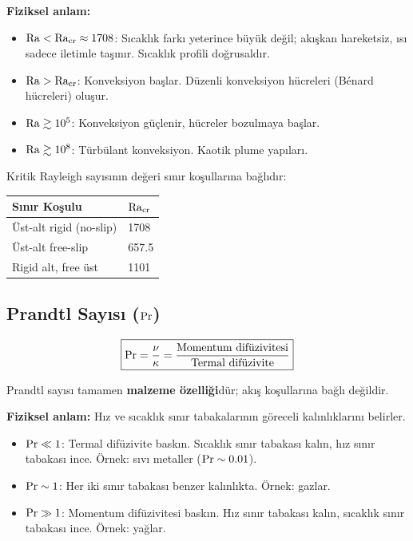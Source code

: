 \textbf{Fiziksel anlam:}
\begin{itemize}
    \item $\mathrm{Ra} < \mathrm{Ra}_{\text{cr}} \approx 1708$: Sıcaklık farkı yeterince büyük değil; akışkan hareketsiz, ısı sadece iletimle taşınır. Sıcaklık profili doğrusaldır.
    \item $\mathrm{Ra} > \mathrm{Ra}_{\text{cr}}$: Konveksiyon başlar. Düzenli konveksiyon hücreleri (B\'{e}nard hücreleri) oluşur.
    \item $\mathrm{Ra} \gtrsim 10^5$: Konveksiyon güçlenir, hücreler bozulmaya başlar.
    \item $\mathrm{Ra} \gtrsim 10^8$: Türbülant konveksiyon. Kaotik plume yapıları.
\end{itemize}

Kritik Rayleigh sayısının değeri sınır koşullarına bağlıdır:
\begin{center}
\begin{tabular}{ll}
\toprule
\textbf{Sınır Koşulu} & $\mathrm{Ra}_{\text{cr}}$ \\
\midrule
Üst-alt rigid (no-slip) & 1708 \\
Üst-alt free-slip & 657.5 \\
Rigid alt, free üst & 1101 \\
\bottomrule
\end{tabular}
\end{center}


\subsection{Prandtl Sayısı ($\mathrm{Pr}$)}
\label{subsec:prandtl}

\begin{equation}
    \boxed{\mathrm{Pr} = \frac{\nu}{\kappa} = \frac{\text{Momentum difüzivitesi}}{\text{Termal difüzivite}}}
    \label{eq:prandtl}
\end{equation}

Prandtl sayısı tamamen \textbf{malzeme özelliği}dür; akış koşullarına bağlı değildir.

\textbf{Fiziksel anlam:} Hız ve sıcaklık sınır tabakalarının göreceli kalınlıklarını belirler.
\begin{itemize}
    \item $\mathrm{Pr} \ll 1$: Termal difüzivite baskın. Sıcaklık sınır tabakası kalın, hız sınır tabakası ince. Örnek: sıvı metaller ($\mathrm{Pr} \sim 0.01$).
    \item $\mathrm{Pr} \sim 1$: Her iki sınır tabakası benzer kalınlıkta. Örnek: gazlar.
    \item $\mathrm{Pr} \gg 1$: Momentum difüzivitesi baskın. Hız sınır tabakası kalın, sıcaklık sınır tabakası ince. Örnek: yağlar.
\end{itemize}

